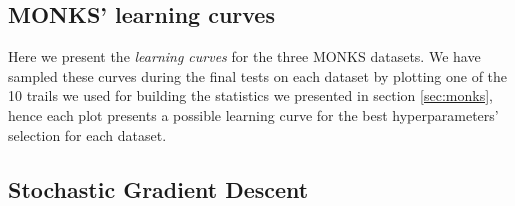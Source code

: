 \begin{appendices}
    \chapter{MONKS' learning curves} %
    \label{cha:monks_learning_curves}
        Here we present the \textit{learning curves} for the three MONKS datasets. We have sampled these curves
        during the final tests on each dataset by plotting one of the 10 trails we used for building the
        statistics we presented in section \ref{sec:monks}, hence each plot presents a possible learning curve
        for the best hyperparameters' selection for each dataset.


        \section{Stochastic Gradient Descent} %
        \label{sec:stochastic_gradient_descent}


\end{appendices}

